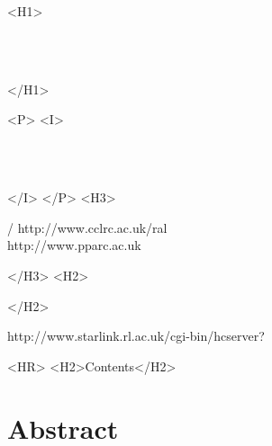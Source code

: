 \begin{htmlonly}
   \xlabel{}
   \begin{rawhtml} <H1> \end{rawhtml}
      \stardoctitle\\
      \stardocversion\\
      \stardocmanual
   \begin{rawhtml} </H1> \end{rawhtml}


   \begin{rawhtml} <P> <I> \end{rawhtml}
   \stardoccategory\ \stardocnumber \\
   \stardocauthors \\
   \stardocdate
   \begin{rawhtml} </I> </P> <H3> \end{rawhtml}
       /
                        {http://www.cclrc.ac.uk/ral} \\
                        {http://www.pparc.ac.uk} \\
   \begin{rawhtml} </H3> <H2> \end{rawhtml}
   \begin{rawhtml} </H2> \end{rawhtml}
      {http://www.starlink.rl.ac.uk/cgi-bin/hcserver?\stardocsource}\\

  \label{stardoccontents}
  \begin{rawhtml}
    <HR>
    <H2>Contents</H2>
  \end{rawhtml}
  \renewcommand{\latexonlytoc}[0]{}

  \section{Abstract}


\end{htmlonly}

